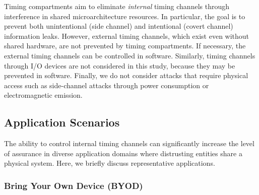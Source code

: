 
Timing compartments aim to eliminate {\em internal} timing channels through
interference in shared microarchitecture resources. In particular, the goal is
to prevent both unintentional (side channel) and intentional (covert channel)
information leaks.
However, external timing
channels, which exist even without shared hardware, are not prevented by
timing compartments. If necessary, the external timing channels can be 
controlled in software. Similarly, timing channels through I/O devices are not 
considered in this study,
because they may be prevented in software.
Finally, we do not consider attacks that require physical access such as
side-channel attacks through power consumption or electromagnetic emission.



\subsection{Application Scenarios}

The ability to control internal timing channels can significantly increase the
level of
assurance in diverse application domains where distrusting entities share a
physical system. Here, we briefly discuss representative applications.

\subsubsection{Bring Your Own Device (BYOD)}

